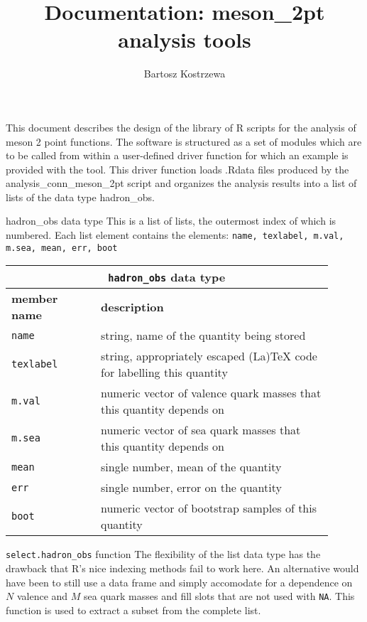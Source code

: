 \documentclass[10pt,a4paper]{article}
\author{Bartosz Kostrzewa}
\title{Documentation: meson\_2pt analysis tools}
\begin{document}
This document describes the design of the library of R scripts for the analysis of meson 2 point functions. The software is structured as a set of modules which are to be called from within a user-defined driver function for which an example is provided with the tool.
This driver function loads .Rdata files produced by the {\ttfamily analysis\_conn\_meson\_2pt} script and organizes the analysis results into a list of lists of the data type {\ttfamily hadron\_obs}.

\begin{section}{{\ttfamily hadron\_obs} data type}
This is a list of lists, the outermost index of which is numbered. Each list element contains the elements: {\tt name, texlabel, m.val, m.sea, mean, err, boot}

{ \centering
\begin{tabular}{|p{0.25\linewidth}|p{0.65\linewidth}|}
\hline
\multicolumn{2}{|c|}{ {\tt hadron\_obs} data type } \\
\hline \hline \textbf{member name} & \textbf{description} \\ \hline
{\tt name} & string, name of the quantity being stored \\ 
{\tt texlabel}  & string, appropriately escaped (La)TeX code for labelling this quantity  \\ 
{\tt m.val} & numeric vector of valence quark masses that this quantity depends on \\
{\tt m.sea} & numeric vector of sea quark masses that this quantity depends on \\
{\tt mean} & single number, mean of the quantity \\
{\tt err} & single number, error on the quantity \\
{\tt boot} & numeric vector of bootstrap samples of this quantity \\
\hline 
\end{tabular}
} %

\begin{subsection}{{\tt select.hadron\_obs} function}
The flexibility of the list data type has the drawback that R's nice indexing methods fail to work here.
An alternative would have been to still use a data frame and simply accomodate for a dependence on $N$ valence and $M$ sea quark masses and fill slots that are not used with {\tt NA}.
This function is used to extract a subset from the complete list.


\end{subsection}
\end{section}
\end{document}
